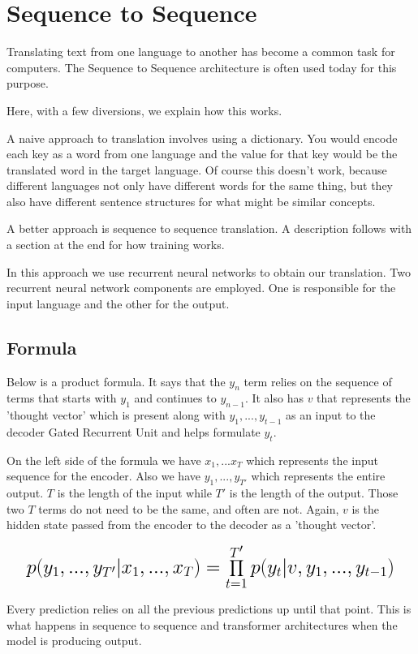 \section{Sequence to Sequence}

Translating text from one language to another has become a common task for computers. The Sequence to Sequence architecture is often used today for this purpose.

Here, with a few diversions, we explain how this works.

A naive approach to translation involves using a dictionary. You would encode each key as a word from one language and the value for that key would be the translated word in the target language. Of course this doesn't work, because different languages not only have different words for the same thing, but they also have different sentence structures for what might be similar concepts.

A better approach is sequence to sequence translation. A description follows with a section at the end for how training works.

In this approach we use recurrent neural networks to obtain our translation. Two recurrent neural network components are employed. One is responsible for the input language and the other for the output. 


\subsection*{Formula}
Below is a product formula. It says that the $y_n$ term relies on the sequence of terms that starts with $y_1$ and continues to $y_{n-1}$. It also has $v$ that represents the 'thought vector' which is present along with $y_1,...,y_{t-1}$ as an input to the decoder Gated Recurrent Unit and helps formulate $y_t$.

On the left side of the formula we have $x_1,...x_T$ which represents the input sequence for the encoder. Also we have $y_1,...,y_{T'}$ which represents the entire output. $T$ is the length of the input while $T'$ is the length of the output. Those two $T$ terms do not need to be the same, and often are not. Again, $v$ is the hidden state passed from the encoder to the decoder as a 'thought vector'.

\[
\mathlarger{ \mathlarger{ \mathlarger{
			p(y_1,...,y_{T'}|x_1,...,x_T) = \prod_{t=1}^{T'} p(y_t|v,y_1,..., y_{t-1}) 
} } }
\]

Every prediction relies on all the previous predictions up until that point. This is what happens in sequence to sequence and transformer architectures when the model is producing output. 

